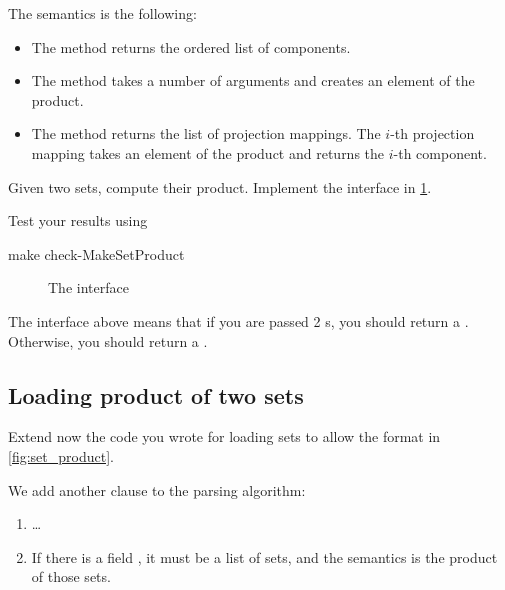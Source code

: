 The semantics is the following:
\begin{itemize}
    \item The method  returns the ordered list of components.
    \item The method  takes a number of arguments and creates an element of the product.
    \item The method  returns the list of projection mappings.
            The $i$-th projection mapping takes an element of the product and returns the $i$-th component.

\end{itemize}


\begin{gradedexercise}
  Given two sets, compute their product. Implement the interface in \cref{fig:MakeSetProduct}.

  Test your results using

\begin{console}
  make check-MakeSetProduct
\end{console}

\end{gradedexercise}


\begin{figure}
\caption{The  interface}
\label{fig:MakeSetProduct}
\end{figure}



The interface above means that if you are passed 2 \FiniteSet{}s, you should return a \FiniteSet.
Otherwise, you should return a \Setoid.

\subsection{Loading product of two sets}



Extend now the code you wrote for loading sets to allow the format in \cref{fig:set_product}.

We add another clause to the parsing algorithm:
\begin{enumerate}
\item \dots
\item If there is a field , it must be a list of sets, and the semantics is the product of those sets.
\end{enumerate}

